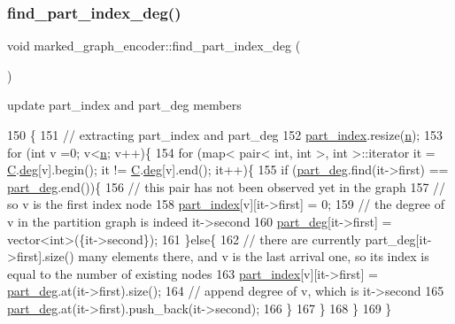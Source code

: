 \subsubsection{\texorpdfstring{find\+\_\+part\+\_\+index\+\_\+deg()}{find\_part\_index\_deg()}}
{\footnotesize\ttfamily void marked\+\_\+graph\+\_\+encoder\+::find\+\_\+part\+\_\+index\+\_\+deg (\begin{DoxyParamCaption}{ }\end{DoxyParamCaption})\hspace{0.3cm}{\ttfamily [private]}}



update part\+\_\+index and part\+\_\+deg members 


\begin{DoxyCode}
150 \{
151   \textcolor{comment}{// extracting part\_index and part\_deg}
152   \hyperlink{classmarked__graph__encoder_a1d3e2b90f5d46244fd4cb33c69ac81f1}{part\_index}.resize(\hyperlink{classmarked__graph__encoder_a4c66d9fdbc14c97523715aac7e4511cb}{n});
153   \textcolor{keywordflow}{for} (\textcolor{keywordtype}{int} v =0; v<\hyperlink{classmarked__graph__encoder_a4c66d9fdbc14c97523715aac7e4511cb}{n}; v++)\{
154     \textcolor{keywordflow}{for} (map< pair< int, int >, \textcolor{keywordtype}{int} >::iterator it = \hyperlink{classmarked__graph__encoder_af82bc0653414091291cb75553a407bdb}{C}.\hyperlink{classcolored__graph_ae3269d35c1b022bc70d195bebd4e1b8a}{deg}[v].begin(); it != 
      \hyperlink{classmarked__graph__encoder_af82bc0653414091291cb75553a407bdb}{C}.\hyperlink{classcolored__graph_ae3269d35c1b022bc70d195bebd4e1b8a}{deg}[v].end(); it++)\{
155       \textcolor{keywordflow}{if} (\hyperlink{classmarked__graph__encoder_a55ea2edb2609dfc287432f61900d6ad1}{part\_deg}.find(it->first) == \hyperlink{classmarked__graph__encoder_a55ea2edb2609dfc287432f61900d6ad1}{part\_deg}.end())\{
156         \textcolor{comment}{// this pair has not been observed yet in the graph}
157         \textcolor{comment}{// so v is the first index node}
158         \hyperlink{classmarked__graph__encoder_a1d3e2b90f5d46244fd4cb33c69ac81f1}{part\_index}[v][it->first] = 0;
159         \textcolor{comment}{// the degree of v in the partition graph is indeed it->second}
160         \hyperlink{classmarked__graph__encoder_a55ea2edb2609dfc287432f61900d6ad1}{part\_deg}[it->first] = vector<int>(\{it->second\}); 
161       \}\textcolor{keywordflow}{else}\{
162         \textcolor{comment}{// there are currently part\_deg[it->first].size() many elements there, and v is the last arrival
       one, so its index is equal to the number of existing nodes }
163         \hyperlink{classmarked__graph__encoder_a1d3e2b90f5d46244fd4cb33c69ac81f1}{part\_index}[v][it->first] = \hyperlink{classmarked__graph__encoder_a55ea2edb2609dfc287432f61900d6ad1}{part\_deg}.at(it->first).size();
164         \textcolor{comment}{// append degree of v, which is it->second}
165         \hyperlink{classmarked__graph__encoder_a55ea2edb2609dfc287432f61900d6ad1}{part\_deg}.at(it->first).push\_back(it->second); 
166       \}
167     \}
168   \}
169 \}
\end{DoxyCode}


